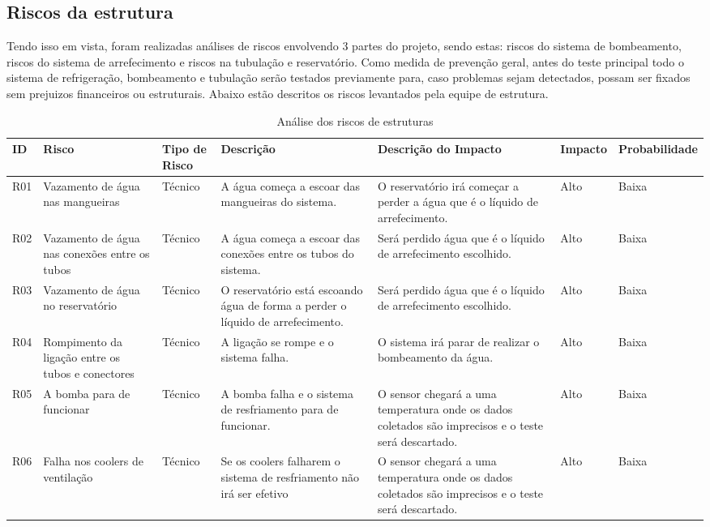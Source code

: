 \subsection{Riscos da estrutura}

Tendo  isso em vista, foram realizadas análises de riscos envolvendo 3 partes do projeto, sendo estas: riscos do sistema de bombeamento, riscos do sistema de arrefecimento e riscos na tubulação e reservatório.
Como medida de prevenção geral, antes do teste principal todo o sistema de refrigeração, bombeamento e tubulação serão testados previamente para, caso problemas sejam detectados, possam ser fixados sem prejuizos financeiros ou estruturais. Abaixo estão descritos os riscos levantados pela equipe de estrutura.

\begin{table}
    \centering
    \begin{tabular}{|p{1cm}|p{2.2cm}|p{1.8cm}|p{3cm}|p{3cm}|p{1.7cm}|p{2cm}|}
    \hline
    \textbf{ID}  & \textbf{Risco} & \textbf{Tipo de Risco} & \textbf{Descrição} & \textbf{Descrição do Impacto} & \textbf{Impacto} & \textbf{Probabilidade} \\ \hline
    R01 & Vazamento de água nas mangueiras & Técnico & A água começa a escoar das mangueiras do sistema. & O reservatório irá começar a perder a água que é o líquido de arrefecimento. & Alto & Baixa \\ \hline
    R02 & Vazamento de água nas conexões entre os tubos & Técnico & A água começa a escoar das conexões entre os tubos do sistema. & Será perdido água que é o líquido de arrefecimento escolhido. & Alto & Baixa \\ \hline
    R03 & Vazamento de água no reservatório & Técnico & O reservatório está escoando água de forma a perder o líquido de arrefecimento. & Será perdido água que é o líquido de arrefecimento escolhido. & Alto & Baixa \\ \hline
    R04 & Rompimento da ligação entre os tubos e conectores & Técnico & A ligação se rompe e o sistema falha. &O sistema irá parar de realizar o bombeamento da água.  & Alto & Baixa \\ \hline
    R05 & A bomba para de funcionar & Técnico & A bomba falha e o sistema de resfriamento para de funcionar. &O sensor chegará a uma temperatura onde os dados coletados são imprecisos e o teste será descartado.  & Alto & Baixa \\ \hline
    R06 & Falha nos coolers de ventilação & Técnico & Se os coolers falharem o sistema de resfriamento não irá ser efetivo  & O sensor chegará a uma temperatura onde os dados coletados são imprecisos e o teste será descartado.  & Alto & Baixa \\ \hline    
\end{tabular}
    \caption{Análise dos riscos de estruturas}
    \end{table} 


